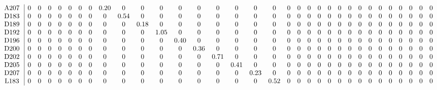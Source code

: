 \begin{table}[H]
\begin{center}
\begin{math}
\begin{array}{c|cccccccccccccccccccccccccccccccc}
\mathrm{A207} \hspace*{2pt} &  0 &  0 &  0 &  0 &  0 &  0 &  0 &       0.20 &  0 &  0 &  0 &  0 &  0 &  0 &  0 &  0 &  0 &  0 &  0 &  0 &  0 &  0 &  0 &  0 &  0 &  0 &  0 &  0 &  0 &  0 &  0 &  0 \\
\mathrm{D183} \hspace*{2pt} &  0 &  0 &  0 &  0 &  0 &  0 &  0 &  0 &       0.54 &  0 &  0 &  0 &  0 &  0 &  0 &  0 &  0 &  0 &  0 &  0 &  0 &  0 &  0 &  0 &  0 &  0 &  0 &  0 &  0 &  0 &  0 &  0 \\
\mathrm{D189} \hspace*{2pt} &  0 &  0 &  0 &  0 &  0 &  0 &  0 &  0 &  0 &       0.18 &  0 &  0 &  0 &  0 &  0 &  0 &  0 &  0 &  0 &  0 &  0 &  0 &  0 &  0 &  0 &  0 &  0 &  0 &  0 &  0 &  0 &  0 \\
\mathrm{D192} \hspace*{2pt} &  0 &  0 &  0 &  0 &  0 &  0 &  0 &  0 &  0 &  0 &       1.05 &  0 &  0 &  0 &  0 &  0 &  0 &  0 &  0 &  0 &  0 &  0 &  0 &  0 &  0 &  0 &  0 &  0 &  0 &  0 &  0 &  0 \\
\mathrm{D196} \hspace*{2pt} &  0 &  0 &  0 &  0 &  0 &  0 &  0 &  0 &  0 &  0 &  0 &       0.40 &  0 &  0 &  0 &  0 &  0 &  0 &  0 &  0 &  0 &  0 &  0 &  0 &  0 &  0 &  0 &  0 &  0 &  0 &  0 &  0 \\
\mathrm{D200} \hspace*{2pt} &  0 &  0 &  0 &  0 &  0 &  0 &  0 &  0 &  0 &  0 &  0 &  0 &       0.36 &  0 &  0 &  0 &  0 &  0 &  0 &  0 &  0 &  0 &  0 &  0 &  0 &  0 &  0 &  0 &  0 &  0 &  0 &  0 \\
\mathrm{D202} \hspace*{2pt} &  0 &  0 &  0 &  0 &  0 &  0 &  0 &  0 &  0 &  0 &  0 &  0 &  0 &       0.71 &  0 &  0 &  0 &  0 &  0 &  0 &  0 &  0 &  0 &  0 &  0 &  0 &  0 &  0 &  0 &  0 &  0 &  0 \\
\mathrm{D205} \hspace*{2pt} &  0 &  0 &  0 &  0 &  0 &  0 &  0 &  0 &  0 &  0 &  0 &  0 &  0 &  0 &       0.41 &  0 &  0 &  0 &  0 &  0 &  0 &  0 &  0 &  0 &  0 &  0 &  0 &  0 &  0 &  0 &  0 &  0 \\
\mathrm{D207} \hspace*{2pt} &  0 &  0 &  0 &  0 &  0 &  0 &  0 &  0 &  0 &  0 &  0 &  0 &  0 &  0 &  0 &       0.23 &  0 &  0 &  0 &  0 &  0 &  0 &  0 &  0 &  0 &  0 &  0 &  0 &  0 &  0 &  0 &  0 \\
\mathrm{L183} \hspace*{2pt} &  0 &  0 &  0 &  0 &  0 &  0 &  0 &  0 &  0 &  0 &  0 &  0 &  0 &  0 &  0 &  0 &       0.52 &  0 &  0 &  0 &  0 &  0 &  0 &  0 &  0 &  0 &  0 &  0 &  0 &  0 &  0 &  0 \\

\end{array}
\end{math}
\end{center}
\end{table}
